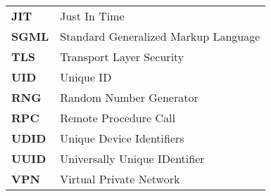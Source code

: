 \begin{table*}[htbp]
\begin{tabular}{ll}
             \textbf{JIT} & Just In Time \\		     
		     
		     \textbf{SGML} & Standard Generalized Markup Language \\
 		     
 		     \textbf{TLS} & Transport Layer Security \\
 		     
 		     \textbf{UID} & Unique ID \\
 		     
 		     \textbf{RNG} & Random Number Generator\\
 		     \textbf{RPC} & Remote Procedure Call \\
 		     
 		     \textbf{UDID} & Unique Device Identifiers\\
 		     \textbf{UUID} &  Universally Unique IDentifier \\
 		 	 
 		 	 \textbf{VPN} & Virtual Private Network \\
		\end{tabular}
\end{table*}